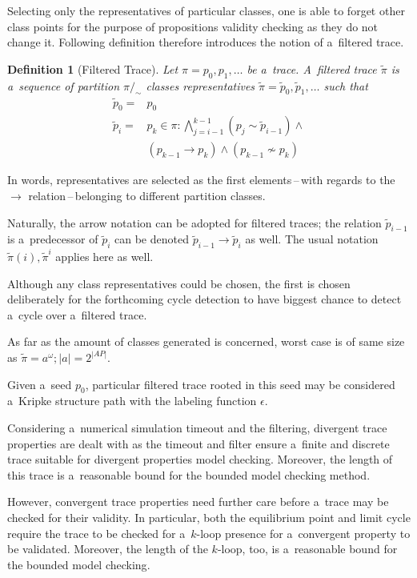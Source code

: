 \documentclass[12pt,twoside,draft]{fithesis}
\newtheorem{mydef}{Definition}
\begin{document}
Selecting only the representatives of particular classes, one is able to
forget other class points for the purpose of propositions validity
checking as they do not change it. Following definition therefore
introduces the notion of a~filtered trace.
\begin{mydef}[Filtered Trace] Let $\pi=p_0,p_1,\dotsc$ be a~trace.
A~filtered trace $\tilde{\pi}$ is a~sequence of partition
$\pi/_{\sim}$ classes representatives
$\tilde{\pi}=\tilde{p}_0,\tilde{p}_1,\dotsc$ such that
\begin{align}
\tilde{p}_{0}=&p_0\\
\tilde{p}_{i}=&p_k\in\pi:\bigwedge_{j=i-1}^{k-1}\left(
	p_j\sim \tilde{p}_{i-1}\right)
	\wedge\nonumber\\
	&(p_{k-1}\rightarrow p_{k})\wedge(p_{k-1}\not\sim p_{k})
\end{align}
\end{mydef}
In words, representatives are selected as the first elements\,--\,with
regards to the $\rightarrow$ relation\,--\,belonging to different
partition classes. 

Naturally, the arrow notation can be adopted for filtered traces;
the relation $\tilde{p}_{i-1}$ is a~predecessor of $\tilde{p}_{i}$ can
be denoted $\tilde{p}_{i-1}\rightarrow\tilde{p}_{i}$ as well. The usual
notation $\tilde{\pi}(i),\tilde{\pi}^i$ applies here as well.

Although any class representatives could be chosen, the first is chosen
deliberately for the forthcoming cycle detection to have biggest chance
to detect a~cycle over a~filtered trace.

As far as the amount of classes generated is concerned, worst case is
of same size as $\tilde{\pi}=a^\omega; |a|=2^{|AP|}$.

Given a~seed $p_0$, particular filtered trace rooted in this seed may be
considered a~Kripke structure path with the labeling function
$\epsilon$.

Considering a~numerical simulation timeout and the filtering,
divergent trace properties are dealt with as the timeout and filter
ensure a~finite and discrete trace suitable for divergent properties
model checking. Moreover, the length of this trace is a~reasonable bound
for the bounded model checking method\cite{biere}.

However, convergent trace properties need further care before a~trace
may be checked for their validity. In particular, both the equilibrium
point and limit cycle require the trace to be checked for a~$k$-loop
presence for a~convergent property to be validated. Moreover, the length
of the $k$-loop, too, is a~reasonable bound for the bounded model
checking\cite{biere}.
\end{document}
